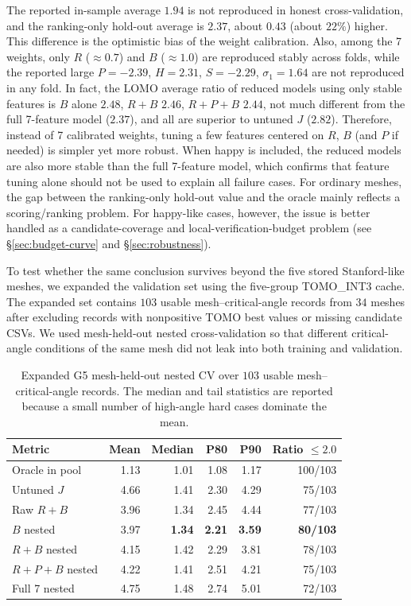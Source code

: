 \documentclass[11pt,a4paper]{article}
\begin{document}
The reported in-sample average $1.94$ is not reproduced in honest cross-validation,
and the ranking-only hold-out average is $2.37$, about $0.43$ (about $22\%$) higher. This difference is the optimistic bias of the weight calibration.
Also, among the 7 weights, only $R$ ($\approx 0.7$) and $B$ ($\approx 1.0$) are reproduced stably across folds,
while the reported large $P=-2.39$, $H=2.31$, $S=-2.29$, $\sigma_1=1.64$ are not reproduced in any fold.
In fact, the LOMO average ratio of reduced models using only stable features is
$B$ alone $2.48$, $R+B$ $2.46$, $R+P+B$ $2.44$, not much different from the full 7-feature model ($2.37$),
and all are superior to untuned $J$ ($2.82$).
Therefore, instead of 7 calibrated weights, tuning a few features centered on $R$, $B$ (and $P$ if needed) is simpler yet more robust.
When happy is included, the reduced models are also more stable than the full 7-feature model,
which confirms that feature tuning alone should not be used to explain all failure cases.
For ordinary meshes, the gap between the ranking-only hold-out value and the oracle mainly reflects a scoring/ranking problem.
For happy-like cases, however, the issue is better handled as a candidate-coverage and local-verification-budget problem (see \S\ref{sec:budget-curve} and \S\ref{sec:robustness}).

To test whether the same conclusion survives beyond the five stored Stanford-like meshes,
we expanded the validation set using the five-group TOMO\_INT3 cache.
The expanded set contains $103$ usable mesh--critical-angle records from $34$ meshes after excluding records with nonpositive TOMO best values or missing candidate CSVs.
We used mesh-held-out nested cross-validation so that different critical-angle conditions of the same mesh did not leak into both training and validation.

\begin{table}[H]
\centering
\caption{Expanded G5 mesh-held-out nested CV over $103$ usable mesh--critical-angle records.
The median and tail statistics are reported because a small number of high-angle hard cases dominate the mean.}
\label{tab:expanded-cv}
\begin{tabular}{lrrrrr}
\toprule
Metric & Mean & Median & P80 & P90 & Ratio $\le 2.0$\\
\midrule
Oracle in pool & 1.13 & 1.01 & 1.08 & 1.17 & 100/103\\
Untuned $J$ & 4.66 & 1.41 & 2.30 & 4.29 & 75/103\\
Raw $R+B$ & 3.96 & 1.34 & 2.45 & 4.44 & 77/103\\
$B$ nested & 3.97 & \textbf{1.34} & \textbf{2.21} & \textbf{3.59} & \textbf{80/103}\\
$R+B$ nested & 4.15 & 1.42 & 2.29 & 3.81 & 78/103\\
$R+P+B$ nested & 4.22 & 1.41 & 2.51 & 4.21 & 75/103\\
Full 7 nested & 4.75 & 1.48 & 2.74 & 5.01 & 72/103\\
\bottomrule
\end{tabular}
\end{table}
\end{document}
